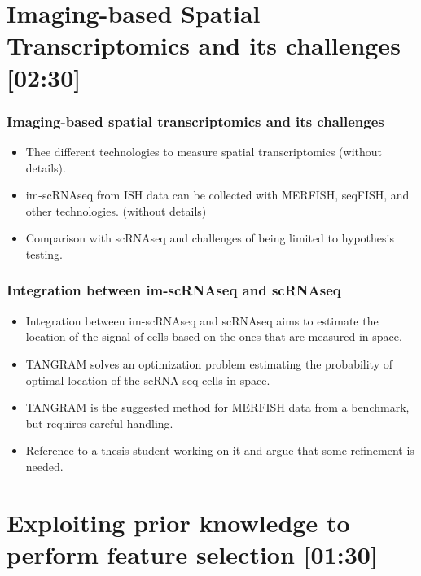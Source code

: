 \section{Imaging-based Spatial Transcriptomics and its challenges {[02:30]}}

\begin{frame}
    \frametitle{Imaging-based spatial transcriptomics and its challenges}
    \begin{block}{}
        \begin{itemize}
            \item Thee different technologies to measure spatial transcriptomics (without details).
            \item im-scRNAseq from ISH data can be collected with MERFISH, seqFISH, and other technologies. (without details)
            \item Comparison with scRNAseq and challenges of being limited to hypothesis testing.
        \end{itemize}
    \end{block}
\end{frame}

\begin{frame}
    \frametitle{Integration between im-scRNAseq and scRNAseq}
    \begin{block}{}
        \begin{itemize}
            \item Integration between im-scRNAseq and scRNAseq aims to estimate the location of the signal of cells based
                on the ones that are measured in space.
            \item TANGRAM solves an optimization problem estimating the probability of optimal location 
                of the scRNA-seq cells in space.
            \item TANGRAM is the suggested method for MERFISH data from a benchmark, but requires careful handling.
            \item Reference to a thesis student working on it and argue that some refinement is needed.
        \end{itemize}
    \end{block}
\end{frame}

\section{Exploiting prior knowledge to perform feature selection {[01:30]}}


